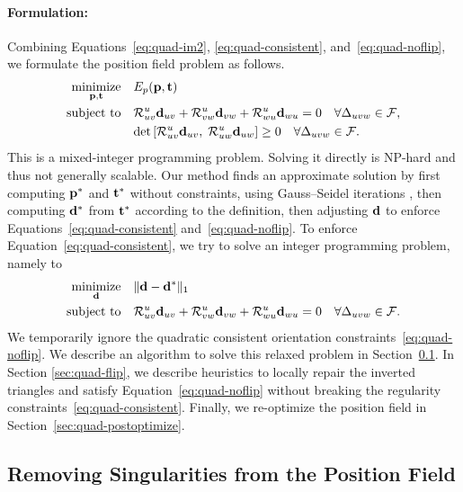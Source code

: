 \paragraph*{Formulation:}
Combining Equations~\eqref{eq:quad-im2}, \eqref{eq:quad-consistent}, and~\eqref{eq:quad-noflip}, we formulate the position field problem as follows.
\begin{align*}
\operatorname*{minimize}_{\mathbf{p}, \mathbf{t}} \quad & E_p(\mathbf{p}, \mathbf{t})\\
\text{subject to} \quad & \mathcal{R}^u_{uv}{\mathbf{d}}_{uv} + \mathcal{R}^u_{vw}{\mathbf{d}}_{vw} + \mathcal{R}^u_{wu}{\mathbf{d}}_{wu} = 0 \quad \forall \Delta_{uvw} \in \mathcal{F},  \\
                   & \text{det} \left[\mathcal{R}^u_{uv}{\mathbf{d}}_{uv},\;\mathcal{R}^u_{uw}{\mathbf{d}}_{uw}\right]\geq 0 \quad \forall \Delta_{uvw} \in \mathcal{F}.
\end{align*}
This is a mixed-integer programming problem. Solving it directly is NP-hard and thus not generally scalable. Our method finds an approximate solution by first computing $\mathbf{p}^*$ and $\mathbf{t}^*$ without constraints, using Gauss--Seidel iterations \cite{jakob2015instant}, then computing $\mathbf{d}^*$ from $\mathbf{t}^*$ according to the definition, then adjusting $\mathbf{d}$ to enforce Equations~\eqref{eq:quad-consistent} and~\eqref{eq:quad-noflip}. To enforce Equation~\eqref{eq:quad-consistent}, we try to solve an integer programming problem, namely to
\begin{align}
\operatorname*{minimize}_{\mathbf{d}} \quad & \lVert \mathbf{d}-\mathbf{d}^*\rVert_1 \label{eq:quad-formulation} \\
\text{subject to} \quad &
\mathcal{R}^u_{uv}{\mathbf{d}}_{uv} + \mathcal{R}^u_{vw}{\mathbf{d}}_{vw} + \mathcal{R}^u_{wu}{\mathbf{d}}_{wu} = 0 \quad \forall \Delta_{uvw} \in \mathcal{F}.\nonumber
\end{align}
We temporarily ignore the quadratic consistent orientation constraints~\eqref{eq:quad-noflip}. We describe an algorithm to solve this relaxed problem in Section~\ref{sec:quad-maxflow}.   In Section \ref{sec:quad-flip}, we describe heuristics to locally repair the inverted triangles and satisfy Equation~\eqref{eq:quad-noflip} without breaking the regularity constraints~\eqref{eq:quad-consistent}.  Finally, we re-optimize the position field in Section~\ref{sec:quad-postoptimize}.

\subsection{Removing Singularities from the Position Field}
\label{sec:quad-maxflow}

